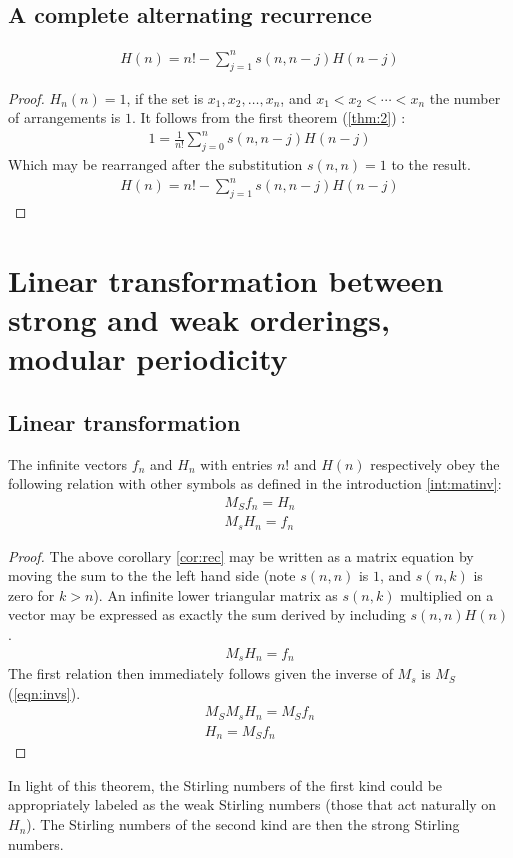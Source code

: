 \documentclass[12pt,reqno]{article}
\begin{document}
\subsection{A complete alternating recurrence}
\begin{corollary}\label{cor:rec}


\begin{align}
	H(n) = n!  - \sum_{j = 1}^{n} s(n,n - j) H(n - j)
\end{align}
\begin{proof}
$H_{n}(n) = 1$, if the set is $x_{1}, x_{2},\ldots, x_{n}$, and $x_{1} < x_{2} < \cdots < x_{n}$ the number of arrangements is $1$. It follows from the first theorem (\ref{thm:2}) :
\begin{align}
	1  = \frac{1}{n!}\sum_{j = 0}^{n} s(n,n - j) H(n - j)
\end{align}
Which may be rearranged after the substitution $s(n,n) = 1$ to the result.
\begin{align}
	H(n)  = n! - \sum_{j = 1}^{n} s(n,n - j) H(n - j) \nonumber
\end{align}
\end{proof}
\end{corollary}

\section{Linear transformation between strong and weak orderings, modular periodicity}
\subsection{Linear transformation}
\begin{theorem}
	The infinite vectors $f_{n}$ and $H_{n}$ with entries $n!$ and $H(n)$ respectively obey the following relation with other symbols as defined in the introduction \ref{int:matinv}:
	\begin{align}
		M_{S}f_{n} = H_{n}\label{eqn:mat1}\\
		M_{s}H_{n} = f_{n}
	\end{align}

	\begin{proof}
		The above corollary \ref{cor:rec} may be written as a matrix  equation by moving the sum to the the left hand side (note $s(n,n)$ is $1$, and $s(n,k)$ is zero for $k > n$). An infinite lower triangular matrix as $s(n,k)$ multiplied on a vector may be expressed as exactly the sum derived by including $s(n,n)H(n)$.
		\begin{align}
			M_{s}H_{n} = f_{n} \nonumber
		\end{align}
		The first relation then immediately follows given the inverse of $M_{s}$ is $M_{S}$ (\ref{eqn:invs}).
		\begin{align}
			M_{S}M_{s}H_{n} = M_{S} f_{n}\\
			H_{n} = M_{S} f_{n} \nonumber
		\end{align}
	\end{proof}
\end{theorem}
In light of this theorem, the Stirling numbers of the first kind could be appropriately labeled as the weak Stirling numbers (those that act naturally on $H_{n}$). The Stirling numbers of the second kind are then the strong Stirling numbers.
\end{document}
